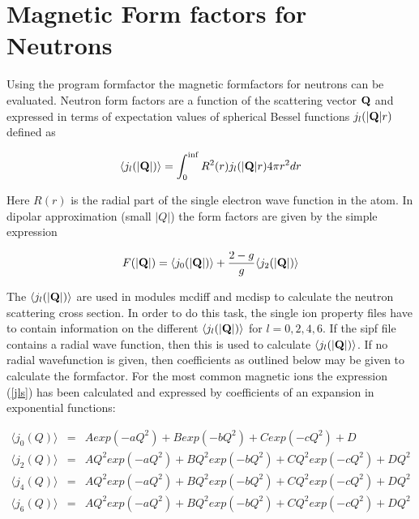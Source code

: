 \section{Magnetic Form factors for Neutrons}\label{ffacts}

Using the program {\prg formfactor} the magnetic formfactors for neutrons
can be evaluated.
Neutron form factors are a function of the scattering vector
$\mathbf Q$ and expressed in terms of expectation values
of spherical Bessel functions $j_l(|\mathbf Q|r)$ defined as 

\begin{equation}\label{jls}
\langle j_l(|\mathbf Q|) \rangle =\int_0^{\inf} R^2(r) j_l(|\mathbf Q|r) 4\pi r^2 dr
\end{equation}

Here $R(r)$ is the radial part of the single electron wave function in the
atom. In dipolar approximation (small $|Q|$) the form factors are given
by the simple expression

\begin{equation}
F(|\mathbf Q|)=\langle j_0(|\mathbf Q|) \rangle + \frac{2-g}{g}\langle j_2(|\mathbf Q|) \rangle  
\end{equation}

The $\langle j_l(|\mathbf Q|) \rangle$ are used in modules {\prg mcdiff} and {\prg mcdisp} 
to calculate the neutron
scattering cross section. In order to do this task, the single ion property files have
 to contain information on the different $\langle j_l(|\mathbf Q|) \rangle$ for
 $l=0,2,4,6$. If the sipf file contains a radial wave function, then this is used to
calculate $\langle j_l(|\mathbf Q|) \rangle$. If no radial wavefunction is given, then
 coefficients as outlined below may be given to calculate the formfactor.
 For the most common magnetic ions the expression (\ref{jls}) has been calculated
 and expressed by coefficients of an expansion in exponential functions:
 
\begin{eqnarray}
\langle j_0(Q) \rangle&=&A exp(-aQ^2)+B exp(-bQ^2)+C exp(-cQ^2)+D \\
\langle j_2(Q) \rangle&=&A Q^2 exp(-aQ^2)+B Q^2 exp(-bQ^2)+C Q^2 exp(-cQ^2)+D Q^2 \\
\langle j_4(Q) \rangle&=&A Q^2 exp(-aQ^2)+B Q^2 exp(-bQ^2)+C Q^2 exp(-cQ^2)+D Q^2 \\
\langle j_6(Q) \rangle&=&A Q^2 exp(-aQ^2)+B Q^2 exp(-bQ^2)+C Q^2 exp(-cQ^2)+D Q^2 
\end{eqnarray}
 
